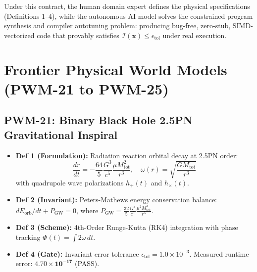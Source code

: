 \documentclass[10pt,journal,compsoc]{IEEEtran}
\theoremstyle{definition}
\begin{document}
Under this contract, the human domain expert defines the physical specifications (Definitions 1–4), while the autonomous AI model solves the constrained program synthesis and compiler autotuning problem: producing bug-free, zero-stub, SIMD-vectorized code that provably satisfies $\mathcal{I}(\mathbf{x}) \le \epsilon_{\text{tol}}$ under real execution.

\section{Frontier Physical World Models (PWM-21 to PWM-25)}

\subsection{PWM-21: Binary Black Hole 2.5PN Gravitational Inspiral}
\begin{itemize}
    \item \textbf{Def 1 (Formulation):} Radiation reaction orbital decay at 2.5PN order:
    \begin{equation}
    \frac{dr}{dt} = -\frac{64}{5} \frac{G^3}{c^5} \frac{\mu M_{\text{tot}}^2}{r^3}, \quad \omega(r) = \sqrt{\frac{G M_{\text{tot}}}{r^3}}
    \end{equation}
    with quadrupole wave polarizations $h_+(t)$ and $h_\times(t)$.
    \item \textbf{Def 2 (Invariant):} Peters-Mathews energy conservation balance: $dE_{\text{orb}}/dt + P_{\text{GW}} = 0$, where $P_{\text{GW}} = \frac{32}{5} \frac{G^4}{c^5} \frac{\mu^2 M_{\text{tot}}^3}{r^5}$.
    \item \textbf{Def 3 (Scheme):} 4th-Order Runge-Kutta (RK4) integration with phase tracking $\Phi(t) = \int 2\omega \, dt$.
    \item \textbf{Def 4 (Gate):} Invariant error tolerance $\epsilon_{\text{tol}} = 1.0 \times 10^{-3}$. Measured runtime error: $\mathbf{4.70 \times 10^{-17}}$ (\checkmark PASS).
\end{itemize}
\end{document}
